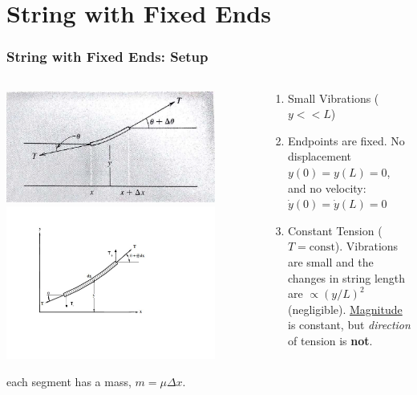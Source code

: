\documentclass[pdf, handout, hideothersubsections]{beamer}
\begin{document}
\section{String with Fixed Ends}
\begin{frame}
\frametitle{String with Fixed Ends: Setup}
\begin{columns}
  \begin{column}{0.4\textwidth}
    \includegraphics[width=0.85\textwidth]{StringFixedEnds.jpg}
    \pause
    \includegraphics[width=0.85\textwidth]{StringForceDiagram.pdf}
   
each segment has a mass, $m = \mu \Delta x$.
\pause
  \end{column}
  \begin{column}{0.6\textwidth}
    \begin{enumerate}
      \item Small Vibrations ($y << L$)
        \pause
      \item Endpoints are fixed. No displacement $y(0) = y(L) = 0$,
          and no velocity: $\dot{y}(0) = \dot{y}(L) = 0$
        \pause
      \item Constant Tension ($T = \mathrm{const}$). Vibrations are
        small and the changes in string length are $\propto (y/L)^2$
        (negligible). \underline{Magnitude} is constant, but
        \emph{direction} of tension is \textbf{not}.
    \end{enumerate}

  \end{column}
\end{columns}
\end{frame}
\end{document}

